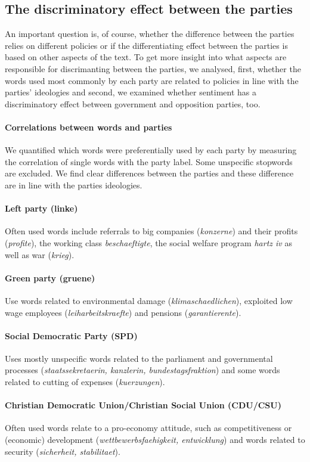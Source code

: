 \documentclass[11pt]{article}
\begin{document}
\subsection{The discriminatory effect between the parties}
\label{sec:discrim_effect}
An important question is, of course, whether the difference between  the parties relies on different policies or if the differentiating effect between the parties is based on other aspects of the text. To get more insight into what aspects are responsible for discrimanting between the parties, we analysed, first, whether the words used most commonly by each party are related to policies in line with the parties' ideologies and second, we examined whether sentiment has a discriminatory effect between government and opposition parties, too.


\paragraph{Correlations between words and parties}
We quantified which words were preferentially used by each party by measuring the correlation of single words with the party label. Some unspecific stopwords are excluded. We find clear differences between the parties and these difference are in line with the parties ideologies. 
\paragraph{\bf Left party (linke)} Often used words include referrals to big companies ({\em konzerne}) and their profits ({\em profite}), the working class {\em beschaeftigte}, the social welfare program {\em hartz iv} as well as war ({\em krieg}).
\paragraph{\bf Green party (gruene)} Use words related to environmental damage ({\em klimaschaedlichen}), exploited low wage employees ({\em leiharbeitskraefte}) and pensions ({\em garantierente}).
\paragraph{\bf Social Democratic Party (SPD)} Uses mostly unspecific words related to the parliament and governmental processes ({\em staatssekretaerin, kanzlerin, bundestagsfraktion}) and some words related to cutting of expenses ({\em kuerzungen}).
\paragraph{\bf Christian Democratic Union/Christian Social Union (CDU/CSU)}
Often used words relate to a pro-economy attitude, such as competitiveness or (economic) development ({\em wettbewerbsfaehigkeit, entwicklung}) and words related to security ({\em sicherheit, stabilitaet}). 
\end{document}
